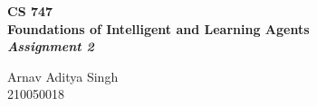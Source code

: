 \begin{titlepage}
    \begin{center}
        \vspace*{1cm}

        \Huge
        \textbf{CS 747} \\
        \huge
        \textbf{Foundations of Intelligent and Learning Agents \\ \textit{Assignment 2}}

        \Large
        \vspace{0.5cm}
        Arnav Aditya Singh\\210050018
    \end{center}
\end{titlepage}
